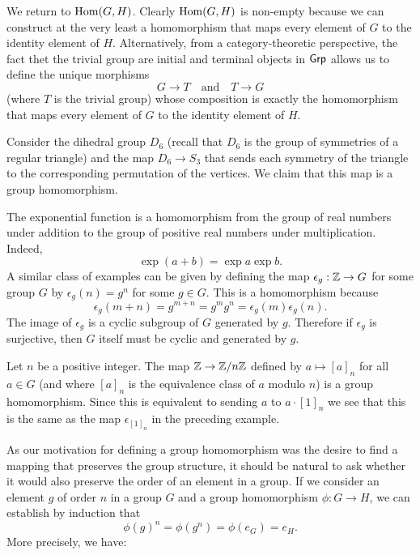 \begin{example}
    We return to \(\operatorname{Hom}(G, H)\). Clearly \(\operatorname{Hom}(G, H)\) is non-empty because we
    can construct at the very least a homomorphism that maps every element of
    \(G\) to the identity element of \(H\). Alternatively, from a
    category-theoretic perspective, the fact thet the trivial group are initial
    and terminal objects in \(\mathsf{Grp}\) allows us to define the unique morphisms
    \[
        G \to T \quad \text{and} \quad T \to G
    \]
    (where \(T\) is the trivial group) whose composition is exactly the
    homomorphism that maps every element of \(G\) to the identity element of
    \(H\).
\end{example}

\begin{example}
    Consider the dihedral group \(D_6\) (recall that \(D_6\) is the group of
    symmetries of a regular triangle) and the map \(D_6 \to S_3\) that sends
    each symmetry of the triangle to the corresponding permutation of the
    vertices. We claim that this map is a group homomorphism.
\end{example}

\begin{example}
    The exponential function is a homomorphism from the group of real numbers
    under addition to the group of positive real numbers under multiplication.
    Indeed,
    \[
        \exp (a + b) = \exp a \exp b.
    \]
    A similar class of examples can be given by defining the map \(\epsilon_g :
    \mathbb{Z} \to G\) for some group \(G\) by \(\epsilon_g(n) = g^n\) for some \(g \in
    G\). This is a homomorphism because
    \[
        \epsilon_g(m + n) = g^{m + n} = g^m g^n = \epsilon_g(m) \epsilon_g(n).
    \]
    The image of \(\epsilon_g\) is a cyclic subgroup of \(G\) generated by
    \(g\). Therefore if \(\epsilon_g\) is surjective, then \(G\) itself must be
    cyclic and generated by \(g\).
\end{example}

\begin{example}
    Let \(n\) be a positive integer. The map \(\mathbb{Z} \to \mathbb{Z}/n\mathbb{Z}\) defined by \(a
    \mapsto [a]_n\) for all \(a \in G\) (and where \([a]_n\) is the equivalence
    class of \(a\) modulo \(n\)) is a group homomorphism. Since this is
    equivalent to sending \(a\) to \(a \cdot [1]_n\) we see that this is the
    same as the map \(\epsilon_{[1]_n}\) in the preceding example.
\end{example}

\begin{remark}
    \label{rem:homomorphism-order}
    As our motivation for defining a group homomorphism was the desire to find a
    mapping that preserves the group structure, it should be natural to ask
    whether it would also preserve the order of an element in a group. If we
    consider an element \(g\) of order \(n\) in a group \(G\) and a group
    homomorphism \(\phi: G \to H\), we can establish by induction that
    \[
        \phi(g)^n = \phi(g^n) = \phi(e_G) = e_H.
    \]
    More precisely, we have:
\end{remark}

